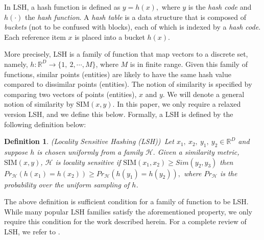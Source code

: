 \documentclass{imsart}
\newtheorem{definition}{Definition}
\begin{document}
In LSH, a hash function is defined as $y = h(x),$ where $y$ is the \emph{hash code} and $h(\cdot)$ the \emph{hash function}. A \emph{hash table} is a data structure that is composed of \emph{buckets} (not to be confused with blocks), each of which is indexed by a \emph{hash code}. Each reference item $x$ is placed into a bucket $h(x).$

More precisely, LSH is a family of function that map vectors to a discrete set, namely, $h:\mathbb{R}^D \rightarrow \{1, \ 2,\cdots , M\}$, where $M$ is in finite range. Given this family of functions, similar points (entities) are likely to have the same hash value compared to dissimilar points (entities). The notion of similarity is specified by comparing two vectors of points (entities), $x$ and $y.$ We will denote a general notion of similarity by $\text{SIM}({x,y}).$ In this paper, we only require a relaxed version LSH, and we define this below. Formally, a LSH is defined by the following definition below:

\begin{definition} (Locality Sensitive Hashing (LSH))\ Let $x_1, \ x_2, \ y_1, \ y_2 \in \mathbb{R}^D$ and suppose $h$ is chosen uniformly from a family $\mathcal{H}.$ Given a similarity metric, $\text{SIM}(x,y)$, $\mathcal{H}$ is locality sensitive if $\text{SIM}(x_1,x_2)\ge Sim(y_2,y_3)$ then ${Pr}_\mathcal{H}(h(x_1) = h(x_2)) \ge {Pr}_\mathcal{H}(h(y_1) = h(y_2)),$ where ${Pr}_\mathcal{H}$ is the probability over the uniform sampling of $h$.
\end{definition}

The above definition is sufficient condition for a family of function to be LSH. While many popular LSH families satisfy the aforementioned property, we only require this condition for the work described herein. For a complete review of LSH, we refer to \cite{rajaraman_2012}.
\end{document}
